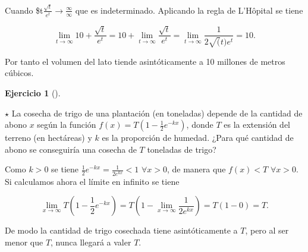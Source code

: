 \documentclass[
  spanish,
  a4paper,
]{scrreport}
\theoremstyle{definition}
\newtheorem{exercise}{Ejercicio}[chapter]
\theoremstyle{remark}
\begin{document}
\begin{tcolorbox}[enhanced jigsaw, arc=.35mm, bottomrule=.15mm, bottomtitle=1mm, breakable, colback=white, colbacktitle=quarto-callout-tip-color!10!white, colframe=quarto-callout-tip-color-frame, coltitle=black, left=2mm, leftrule=.75mm, opacityback=0, opacitybacktitle=0.6, rightrule=.15mm, title=\textcolor{quarto-callout-tip-color}{\faLightbulb}\hspace{0.5em}{Solución}, titlerule=0mm, toprule=.15mm, toptitle=1mm]

Cuando \$t\to\infty \(\frac{\sqrt{t}}{e^t}\to \frac{\infty}{\infty}\)
que es indeterminado. Aplicando la regla de L'Hôpital se tiene

\[
\lim_{t\to \infty} 10 + \frac{\sqrt{t}}{e^t} = 10 + \lim_{t\to \infty} \frac{\sqrt{t}}{e^t} = \lim_{t\to \infty}\frac{1}{2\sqrt(t)e^t} = 10.
\]

Por tanto el volumen del lato tiende asintóticamente a 10 millones de
metros cúbicos.

\end{tcolorbox}

\begin{exercise}[]\protect\hypertarget{exr-cosecha}{}\label{exr-cosecha}

\(\star\) La cosecha de trigo de una plantación (en toneladas) depende
de la cantidad de abono \(x\) según la función
\(f(x)=T(1-\frac{1}{2}e^{-kx})\), donde \(T\) es la extensión del
terreno (en hectáreas) y \(k\) es la proporción de humedad. ¿Para qué
cantidad de abono se conseguiría una cosecha de \(T\) toneladas de
trigo?

\end{exercise}

\begin{tcolorbox}[enhanced jigsaw, arc=.35mm, bottomrule=.15mm, bottomtitle=1mm, breakable, colback=white, colbacktitle=quarto-callout-tip-color!10!white, colframe=quarto-callout-tip-color-frame, coltitle=black, left=2mm, leftrule=.75mm, opacityback=0, opacitybacktitle=0.6, rightrule=.15mm, title=\textcolor{quarto-callout-tip-color}{\faLightbulb}\hspace{0.5em}{Solución}, titlerule=0mm, toprule=.15mm, toptitle=1mm]

Como \(k>0\) se tiene \(\frac{1}{2}e^{-kx} = \frac{1}{2e^{kx}} < 1\)
\(\forall x>0\), de manera que \(f(x)<T\) \(\forall x>0\). Si calculamos
ahora el límite en infinito se tiene

\[\lim_{x\to \infty} T(1-\frac{1}{2}e^{-kx}) = T(1-\lim_{x\to \infty}\frac{1}{2e^{kx}}) = T(1-0) = T.
\]

De modo la cantidad de trigo cosechada tiene asintóticamente a \(T\),
pero al ser menor que \(T\), nunca llegará a valer \(T\).

\end{tcolorbox}
\end{document}
